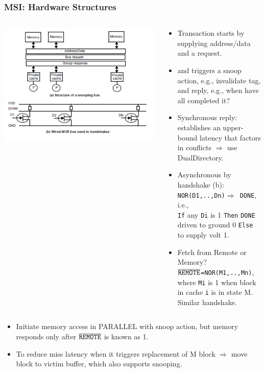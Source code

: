 \documentclass{beamer}
\newcommand{\emp}[1]{\textcolor{DikuRed}{ #1}}
\begin{document}
\begin{frame}[fragile,t]
\frametitle{MSI: Hardware Structures}

\begin{columns}\hspace{-5ex}
\includegraphics[width=47ex]{FigsInfCoherence/SnoopingBus}
\vspace{-3ex}
\begin{scriptsize}
\begin{itemize}
    \item Transaction starts by supplying \emp{address/data} and a \emp{request}.
    \item and triggers a \emp{snoop action}, e.g., invalidate tag, and \emp{reply},
            e.g., when have all completed it?
    \item \emp{Synchronous} reply: establishes an upper-bound latency that 
            factors in conflicts $\Rightarrow$ use DualDirectory. 
    \item \emp{Asynchronous} by handshake (b):\\{{\tt NOR(D1,..,Dn)$\Rightarrow$ DONE}}, i.e.,\\
            {\tt If} any {\tt Di} is 1 {\tt Then} {\tt DONE} driven to ground 0
            {\tt Else} to supply volt 1. 
    \item \emp{Fetch from Remote or Memory?}\\
            $\overline{\mbox{\tt REMOTE}}${\tt=NOR(M1,..,Mn)}, where {\tt Mi} 
            is 1 when block in cache {\tt i} is in state M. Similar handshake.
\end{itemize}
\end{scriptsize}
\end{columns}

\begin{itemize}
    \item Initiate memory access in PARALLEL with snoop action, but memory responds 
        only after $\overline{\mbox{\tt REMOTE}}$ is known as 1.
    \item To reduce miss latency when it triggers replacement of M block $\Rightarrow$
            move block to \emp{victim buffer, which also supports snooping}.
\end{itemize} 

\end{frame}
\end{document}
